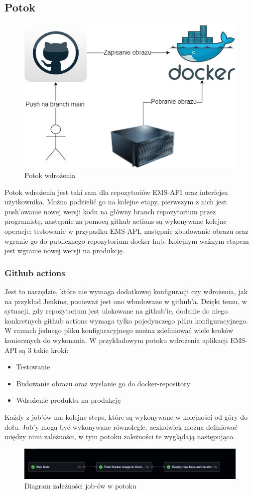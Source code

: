 \subsection{Potok}
\begin{figure}[H]
    \centering
    \includegraphics[width=0.7\linewidth]{img/inz_deploy.png}
    \caption{Potok wdrożenia}
    \label{fig:deploy-pipeline}
\end{figure}
Potok wdrożenia jest taki sam dla repozytoriów EMS-API oraz interfejsu użytkownika. Można podzielić go na kolejne etapy, pierwszym z nich jest push'owanie nowej wersji kodu na główny branch repozytorium przez programistę, następnie za pomocą github actions są wykonywane kolejne operacje: testowanie w przypadku EMS-API, następnie zbudowanie obrazu oraz wgranie go do publicznego repozytorium docker-hub. Kolejnym ważnym etapem jest wgranie nowej wersji na produkcję.

\subsubsection{Github actions}
Jest to narzędzie, które nie wymaga dodatkowej konfiguracji czy wdrożenia, jak na przykład Jenkins, ponieważ jest ono wbudowane w github'a. Dzięki temu, w sytuacji, gdy repozytorium jest ulokowane na github'ie, dodanie do niego konkretnych github actions wymaga tylko pojedynczego pliku konfiguracyjnego. W ramach jednego pliku konfiguracyjnego można zdefiniować wiele kroków koniecznych do wykonania. W przykładowym potoku wdrożenia aplikacji EMS-API są 3 takie kroki:
\begin{itemize}
    \item Testowanie
    \item Budowanie obrazu oraz wysłanie go do docker-repository
    \item Wdrożenie produktu na produkcję
\end{itemize}
Każdy z job'ów ma kolejne steps, które są wykonywane w kolejności od góry do dołu. Job'y mogą być wykonywane równolegle, aczkolwiek można definiować między nimi zależności, w tym potoku zależności te wyglądają następująco.
\begin{figure}[H]
    \centering
    \includegraphics[width=0.75\linewidth]{img/potok-joby.png}
    \caption{Diagram zależności job-ów w potoku}
    \label{fig:jobs-dep}
\end{figure}

